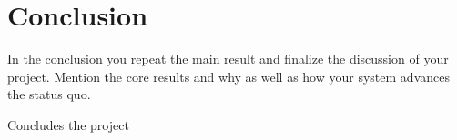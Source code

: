 \documentclass[a4paper,11pt,oneside]{report}
\begin{document}
\chapter{Conclusion}

In the conclusion you repeat the main result and finalize the discussion of
your project. Mention the core results and why as well as how your system
advances the status quo.

Concludes the project 
\cleardoublepage
{}
{}
\printbibliography

%
%
\end{document}
